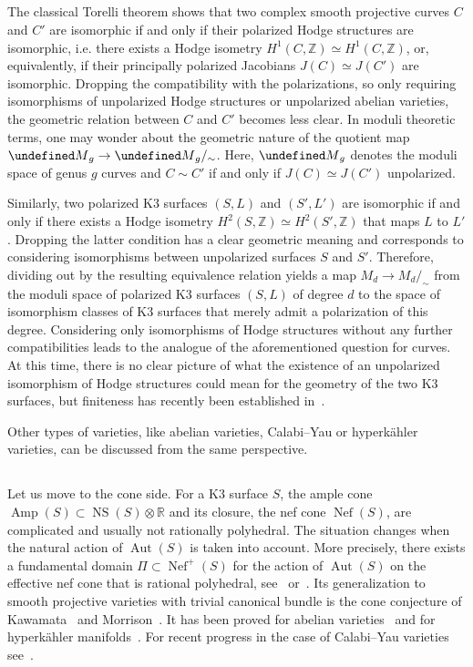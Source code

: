 \documentclass[11pt]{article}
\theoremstyle{definition}
\numberwithin{equation}{section}
\numberwithin{figure}{section}
\numberwithin{table}{section}
\let\cal\undefined
\DeclareMathOperator{\Aut}{Aut}
\DeclareMathOperator{\Nef}{Nef}
\DeclareMathOperator{\Amp}{Amp}
\DeclareMathOperator{\NS}{NS}
\newcommand{\cal}{\mathcal}
\newcommand{\km}{{\cal M}}
\newcommand{\ZZ}{\mathbb{Z}}
\newcommand{\RR}{\mathbb{R}}
\renewcommand{\cong}{\simeq}
\begin{document}
\subsection{}
The classical Torelli theorem shows that two complex smooth projective curves $C$ and $C'$ are isomorphic if and only if their polarized Hodge structures are isomorphic, i.e. there exists a Hodge isometry $H^1(C,\ZZ)\cong H^1(C,\ZZ)$, or, equivalently, if their principally polarized Jacobians $J(C)\cong J(C')$ are isomorphic. Dropping the compatibility with the polarizations, so only requiring isomorphisms of unpolarized Hodge structures or unpolarized abelian varieties, the geometric relation between $C$ and $C'$ becomes less clear. In moduli theoretic terms, one may wonder about the geometric nature of the quotient map $\km_g\to\km_g/_\sim$. Here, $\km_g$ denotes the moduli space of genus $g$ curves and $C\sim C'$ if and only if $J(C)\cong J(C')$ unpolarized.

Similarly, two polarized K3 surfaces $(S,L)$ and $(S',L')$ are isomorphic if and only if there exists a Hodge isometry $H^2(S,\ZZ)\cong H^2(S',\ZZ)$ that maps $L$ to $L'$. Dropping the latter condition has a clear geometric meaning and corresponds to considering isomorphisms between unpolarized surfaces $S$ and $S'$. Therefore, dividing out by the resulting equivalence relation yields a map $M_d\to M_d/_\sim$ from the moduli space of polarized K3 surfaces $(S,L)$ of degree $d$ to the space of isomorphism classes of K3 surfaces that merely admit a polarization of this degree. Considering only isomorphisms of Hodge structures without any further compatibilities leads to the analogue of the aforementioned question for curves. At this time, there is no clear picture of what the existence of an unpolarized isomorphism of Hodge structures could mean for the geometry of the two K3 surfaces, but finiteness has recently been established in~\cite{Ef}.

Other types of varieties, like abelian varieties, Calabi--Yau or hyperk\"ahler varieties, can be discussed from the same perspective.

\subsection{}
Let us move to the cone side. For a K3 surface $S$, the ample cone $\Amp(S)\subset\NS(S)\otimes\RR$ and its closure, the nef cone $\Nef (S)$, are complicated and usually not rationally polyhedral. The situation changes when the natural action of $\Aut(S)$ is taken into account. More precisely, there exists a fundamental domain $\Pi\subset\Nef ^+(S)$ for the action of $\Aut(S)$ on the effective nef cone that is rational polyhedral, see~\cite{Sterk} or~\cite[Chapter~8]{HuyK3}. Its generalization to smooth projective varieties with trivial canonical bundle is the cone conjecture of Kawamata~\cite{Kaw} and Morrison~\cite{Mor}. It has been proved for abelian varieties~\cite{PS} and for hyperk\"ahler manifolds~\cite{AmVerb,AmVerb2,MarYos}. For recent progress in the case of Calabi--Yau varieties see~\cite{LazPet}.
\end{document}
